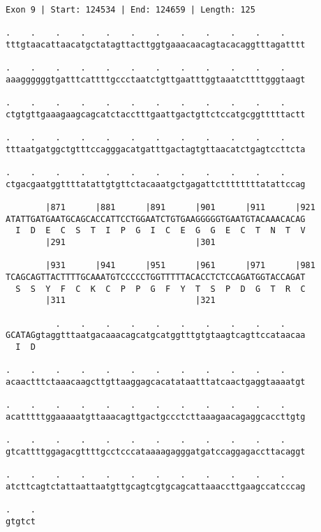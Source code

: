 \documentclass{article}
\begin{document}
\begin{Verbatim}[fontfamily=courier]
Exon 9 | Start: 124534 | End: 124659 | Length: 125

.    .    .    .    .    .    .    .    .    .    .    .    
tttgtaacattaacatgctatagttacttggtgaaacaacagtacacaggtttagatttt

.    .    .    .    .    .    .    .    .    .    .    .    
aaaggggggtgatttcattttgccctaatctgttgaatttggtaaatcttttgggtaagt

.    .    .    .    .    .    .    .    .    .    .    .    
ctgtgttgaaagaagcagcatctacctttgaattgactgttctccatgcggtttttactt

.    .    .    .    .    .    .    .    .    .    .    .    
tttaatgatggctgtttccagggacatgatttgactagtgttaacatctgagtccttcta

.    .    .    .    .    .    .    .    .    .    .    .    
ctgacgaatggttttatattgtgttctacaaatgctgagattcttttttttatattccag

        |871      |881      |891      |901      |911      |921
ATATTGATGAATGCAGCACCATTCCTGGAATCTGTGAAGGGGGTGAATGTACAAACACAG
  I  D  E  C  S  T  I  P  G  I  C  E  G  G  E  C  T  N  T  V
        |291                          |301                  

        |931      |941      |951      |961      |971      |981
TCAGCAGTTACTTTTGCAAATGTCCCCCTGGTTTTTACACCTCTCCAGATGGTACCAGAT
  S  S  Y  F  C  K  C  P  P  G  F  Y  T  S  P  D  G  T  R  C
        |311                          |321                  

          .    .    .    .    .    .    .    .    .    .    
GCATAGgtaggtttaatgacaaacagcatgcatggtttgtgtaagtcagttccataacaa
  I  D                                                      

.    .    .    .    .    .    .    .    .    .    .    .    
acaactttctaaacaagcttgttaaggagcacatataatttatcaactgaggtaaaatgt

.    .    .    .    .    .    .    .    .    .    .    .    
acatttttggaaaaatgttaaacagttgactgccctcttaaagaacagaggcaccttgtg

.    .    .    .    .    .    .    .    .    .    .    .    
gtcattttggagacgttttgcctcccataaaagagggatgatccaggagaccttacaggt

.    .    .    .    .    .    .    .    .    .    .    .    
atcttcagtctattaattaatgttgcagtcgtgcagcattaaaccttgaagccatcccag

.    .
gtgtct
\end{Verbatim}
\newpage
\end{document}
